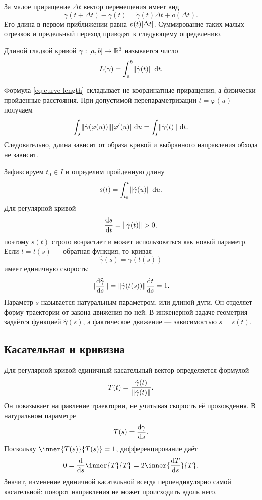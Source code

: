 За малое приращение \(\Delta t\) вектор перемещения имеет вид
\[
\gamma(t+\Delta t)-\gamma(t)
=\dot\gamma(t)\Delta t+o(\Delta t).
\]
Его длина в первом приближении равна \(v(t)\lvert\Delta t\rvert\). Суммирование таких малых отрезков и предельный переход приводят к следующему определению.

\begin{definition}
Длиной гладкой кривой \(\gamma:[a,b]\to\mathbb{R}^3\) называется число
\begin{equation}
\label{eq:curve-length}
L(\gamma)
=\int_a^b\lVert\dot\gamma(t)\rVert\,\mathop{}\!\mathrm{d} t.
\end{equation}
\end{definition}

Формула \eqref{eq:curve-length} складывает не координатные приращения, а физически пройденные расстояния. При допустимой перепараметризации \(t=\varphi(u)\) получаем
\[
\int_J
\lVert\dot\gamma(\varphi(u))\rVert\lvert\varphi'(u)\rvert\,\mathop{}\!\mathrm{d} u
=
\int_I\lVert\dot\gamma(t)\rVert\,\mathop{}\!\mathrm{d} t.
\]
Следовательно, длина зависит от образа кривой и выбранного направления обхода не зависит.

Зафиксируем \(t_0\in I\) и определим пройденную длину
\begin{equation}
\label{eq:arc-length-function}
s(t)
=\int_{t_0}^{t}\lVert\dot\gamma(u)\rVert\,\mathop{}\!\mathrm{d} u.
\end{equation}
Для регулярной кривой
\[
\frac{\mathop{}\!\mathrm{d} s}{\mathop{}\!\mathrm{d} t}=\lVert\dot\gamma(t)\rVert>0,
\]
поэтому \(s(t)\) строго возрастает и может использоваться как новый параметр. Если \(t=t(s)\) --- обратная функция, то кривая
\[
\widehat\gamma(s)=\gamma(t(s))
\]
имеет единичную скорость:
\begin{equation}
\label{eq:unit-speed-curve}
\lVert\frac{\mathop{}\!\mathrm{d} \widehat\gamma}{\mathop{}\!\mathrm{d} s}\rVert
=
\lVert\dot\gamma(t(s))\rVert\frac{\mathop{}\!\mathrm{d} t}{\mathop{}\!\mathrm{d} s}
=1.
\end{equation}
Параметр \(s\) называется натуральным параметром, или длиной дуги. Он отделяет форму траектории от закона движения по ней. В инженерной задаче геометрия задаётся функцией \(\widehat\gamma(s)\), а фактическое движение --- зависимостью \(s=s(t)\).

\subsection{Касательная и кривизна}

Для регулярной кривой единичный касательный вектор определяется формулой
\begin{equation}
\label{eq:unit-tangent}
T(t)
=\frac{\dot\gamma(t)}{\lVert\dot\gamma(t)\rVert}.
\end{equation}
Он показывает направление траектории, не учитывая скорость её прохождения. В натуральном параметре
\[
T(s)=\frac{\mathop{}\!\mathrm{d} \gamma}{\mathop{}\!\mathrm{d} s}.
\]
Поскольку \(\inner{T(s)}{T(s)}=1\), дифференцирование даёт
\[
0
=\dv{}{s}\inner{T}{T}
=2\inner{\dv{T}{s}}{T}.
\]
Значит, изменение единичной касательной всегда перпендикулярно самой касательной: поворот направления не может происходить вдоль него.

